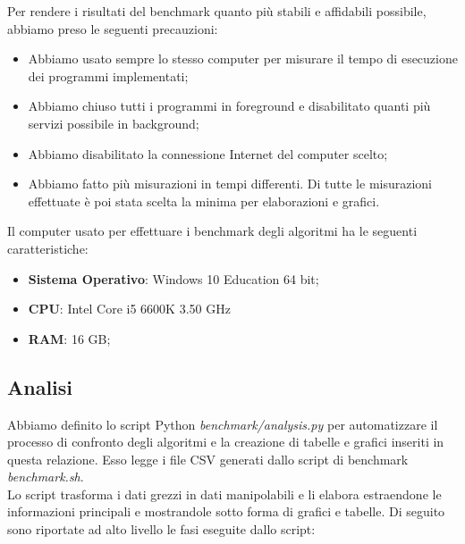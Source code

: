 \noindent Per rendere i risultati del benchmark quanto più stabili e
affidabili possibile, abbiamo preso le seguenti precauzioni:

\begin{itemize}
    \item Abbiamo usato sempre lo stesso computer per misurare il
      tempo di esecuzione dei programmi implementati;
    \item Abbiamo chiuso tutti i programmi in foreground e
      disabilitato quanti più servizi possibile in background;
    \item Abbiamo disabilitato la connessione Internet del computer
      scelto;
    \item Abbiamo fatto più misurazioni in tempi differenti. Di tutte
      le misurazioni effettuate è poi stata scelta la minima per
      elaborazioni e grafici.
\end{itemize}

\noindent Il computer usato per effettuare i benchmark degli algoritmi
ha le seguenti caratteristiche:

\begin{itemize}
    \item \textbf{Sistema Operativo}: Windows 10 Education 64 bit;
    \item \textbf{CPU}: Intel Core i5 6600K 3.50 GHz
    \item \textbf{RAM}: 16 GB;
\end{itemize}

\subsection{Analisi}

\noindent Abbiamo definito lo script Python
\textit{benchmark/analysis.py} per automatizzare il processo di
confronto degli algoritmi e la creazione di tabelle e grafici inseriti
in questa relazione. Esso legge i file CSV generati dallo script di
benchmark \textit{benchmark.sh}. \\

\noindent Lo script trasforma i dati grezzi in dati manipolabili e li
elabora estraendone le informazioni principali e mostrandole sotto
forma di grafici e tabelle. Di seguito sono riportate ad alto
livello le fasi eseguite dallo script:

